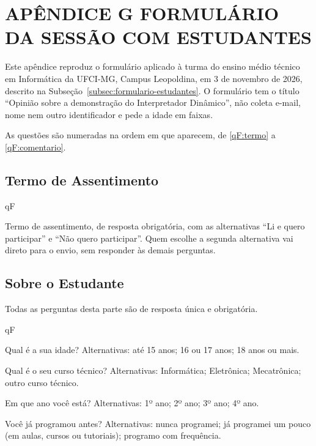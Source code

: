 \chapter[APÊNDICE G -- FORMULÁRIO DA SESSÃO COM ESTUDANTES]{{\centering APÊNDICE G \textendash{} FORMULÁRIO DA SESSÃO COM ESTUDANTES}}  \label{ap:formulario-estudantes}

Este apêndice reproduz o formulário aplicado à turma do ensino médio técnico em Informática da UFCI-MG, Campus Leopoldina, em 3 de novembro de 2026, descrito na Subseção~\ref{subsec:formulario-estudantes}. O formulário tem o título ``Opinião sobre a demonstração do Interpretador Dinâmico'', não coleta e-mail, nome nem outro identificador e pede a idade em faixas.

As questões são numeradas na ordem em que aparecem, de \ref{qF:termo} a \ref{qF:comentario}.

\section{Termo de Assentimento}

\begin{questoes}{qF}
    \item\label{qF:termo} Termo de assentimento, de resposta obrigatória, com as alternativas ``Li e quero participar'' e ``Não quero participar''. Quem escolhe a segunda alternativa vai direto para o envio, sem responder às demais perguntas.
\end{questoes}

\section{Sobre o Estudante}

Todas as perguntas desta parte são de resposta única e obrigatória.

\begin{questoes}{qF}
    \item\label{qF:perfil-ini} Qual é a sua idade? Alternativas: até 15 anos; 16 ou 17 anos; 18 anos ou mais.
    \item Qual é o seu curso técnico? Alternativas: Informática; Eletrônica; Mecatrônica; outro curso técnico.
    \item Em que ano você está? Alternativas: 1º ano; 2º ano; 3º ano; 4º ano.
    \item\label{qF:perfil-fim} Você já programou antes? Alternativas: nunca programei; já programei um pouco (em aulas, cursos ou tutoriais); programo com frequência.
\end{questoes}

